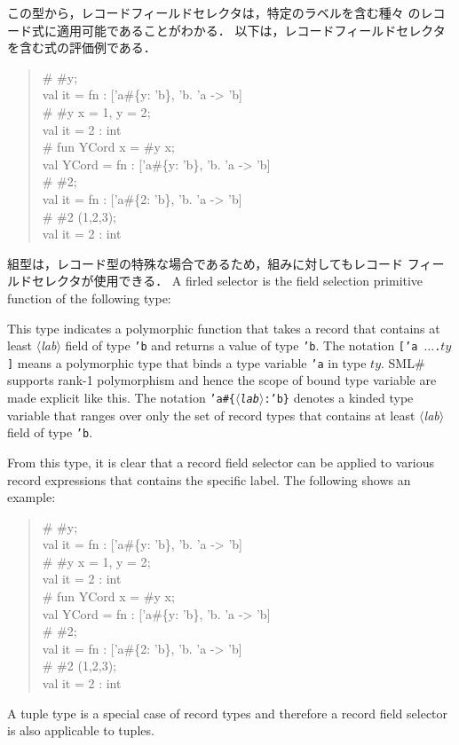 \documentclass{jbook}
\newcommand{\smlsharp}{SML\#}
\newcommand{\code}[1]{\mbox{\large\tt #1}}
\newcommand{\nonterm}[1]{\mbox{$\langle$}{\it #1}\mbox{$\rangle$}}
\newenvironment{program}{\begin{quote}\begin{tt}}%
                        {\end{tt}\end{quote}}
\begin{document}
	この型から，レコードフィールドセレクタは，特定のラベルを含む種々
のレコード式に適用可能であることがわかる．
	以下は，レコードフィールドセレクタを含む式の評価例である．
\begin{program}
\# \#y;
\\
val it = fn : ['a\#\{y: 'b\}, 'b. 'a -> 'b]
\\
\# \#y {x = 1, y = 2};
\\
val it = 2 : int
\\
\# fun YCord x = \#y x;
\\
val YCord = fn : ['a\#\{y: 'b\}, 'b. 'a -> 'b]
\\
\# \#2;
\\
val it = fn : ['a\#\{2: 'b\}, 'b. 'a -> 'b]
\\
\# \#2 (1,2,3);
\\
val it = 2 : int
\end{program}
	組型は，レコード型の特殊な場合であるため，組みに対してもレコード
フィールドセレクタが使用できる．
\else%
	A firled selector is the field selection primitive function
of the following type:
\begin{program}
 ['a\#\{\nonterm{lab}:'b\}, 'b. 'a -> 'b]
\end{program}
	This type indicates a polymorphic function that takes
a record that contains at least \nonterm{lab} field of type \code{'b}
and returns a value of type \code{'b}.
	The notation \code{['a $\ldots$.$ty$]} means a polymorphic
type that binds a type variable \code{'a} in type $ty$.
	\smlsharp{} supports rank-1 polymorphism and hence the scope
of bound type variable are made explicit like this.
	The notation 
\code{'a\#\{\nonterm{lab}:'b\}} denotes a kinded type variable that
ranges over only the set of record types that contains at least
\nonterm{lab} field of type \code{'b}.

	From this type, it is clear that a record field selector can
be applied to various record expressions that contains the specific
label.
	The following shows an example:
\begin{program}
\# \#y;
\\
val it = fn : ['a\#\{y: 'b\}, 'b. 'a -> 'b]
\\
\# \#y {x = 1, y = 2};
\\
val it = 2 : int
\\
\# fun YCord x = \#y x;
\\
val YCord = fn : ['a\#\{y: 'b\}, 'b. 'a -> 'b]
\\
\# \#2;
\\
val it = fn : ['a\#\{2: 'b\}, 'b. 'a -> 'b]
\\
\# \#2 (1,2,3);
\\
val it = 2 : int
\end{program}
        A tuple type is a special case of record types and therefore
a record field selector is also applicable to tuples.
\fi%
\end{document}
